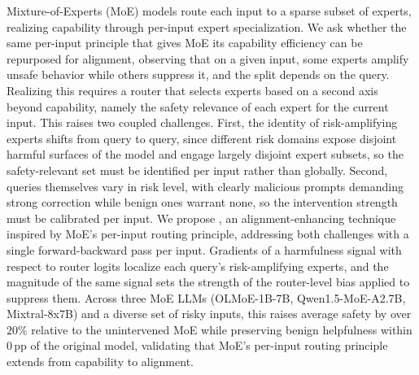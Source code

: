 Mixture-of-Experts (MoE) models route each input to a sparse subset of experts, realizing capability through per-input expert specialization. We ask whether the same per-input principle that gives MoE its capability efficiency can be repurposed for alignment, observing that on a given input, some experts amplify unsafe behavior while others suppress it, and the split depends on the query. Realizing this requires a router that selects experts based on a second axis beyond capability, namely the safety relevance of each expert for the current input. This raises two coupled challenges. First, the identity of risk-amplifying experts shifts from query to query, since different risk domains expose disjoint harmful surfaces of the model and engage largely disjoint expert subsets, so the safety-relevant set must be identified per input rather than globally. Second, queries themselves vary in risk level, with clearly malicious prompts demanding strong correction while benign ones warrant none, so the intervention strength must be calibrated per input. We propose \name{}, an alignment-enhancing technique inspired by MoE's per-input routing principle, addressing both challenges with a single forward-backward pass per input. Gradients of a harmfulness signal with respect to router logits localize each query's risk-amplifying experts, and the magnitude of the same signal sets the strength of the router-level bias applied to suppress them. Across three MoE LLMs (OLMoE-1B-7B, Qwen1.5-MoE-A2.7B, Mixtral-8x7B) and a diverse set of risky inputs, this raises average safety by over $20\%$ relative to the unintervened MoE while preserving benign helpfulness within $0$\,pp of the original model, validating that MoE's per-input routing principle extends from capability to alignment.